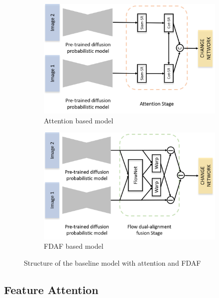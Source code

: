 \documentclass{article}
\begin{document}
\begin{figure}[h]
  \centering
  \begin{subfigure}[b]{0.4\linewidth}
      \includegraphics[width=\linewidth]{baseline_with_attention.png}
      \caption{Attention based model}
      \label{fig:baseline_with_attention}
  \end{subfigure}
  \hspace{0.1\textwidth}
  \begin{subfigure}[b]{0.4\linewidth}
      \includegraphics[width=\linewidth]{baseline_with_fdaf.png}
      \caption{FDAF based model}
      \label{fig:baseline_with_fdaf}
  \end{subfigure}
  \caption{Structure of the baseline model with attention and FDAF}
  \label{fig:baseline_with_attention_and_fdaf}
\end{figure}

\subsection{Feature Attention}
\end{document}
